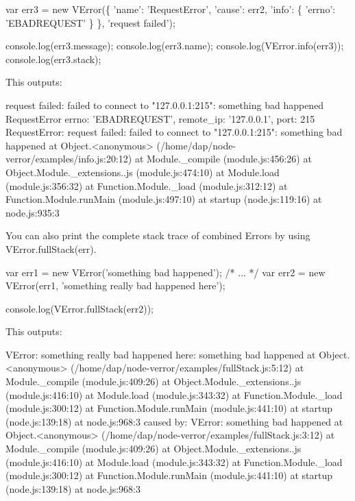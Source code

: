 \begin{DoxyCode}
var err3 = new VError(\{
    'name': 'RequestError',
    'cause': err2,
    'info': \{
        'errno': 'EBADREQUEST'
    \}
\}, 'request failed');

console.log(err3.message);
console.log(err3.name);
console.log(VError.info(err3));
console.log(err3.stack);
\end{DoxyCode}


This outputs\+: \begin{DoxyVerb}request failed: failed to connect to "127.0.0.1:215": something bad happened
RequestError
{ errno: 'EBADREQUEST', remote_ip: '127.0.0.1', port: 215 }
RequestError: request failed: failed to connect to "127.0.0.1:215": something bad happened
    at Object.<anonymous> (/home/dap/node-verror/examples/info.js:20:12)
    at Module._compile (module.js:456:26)
    at Object.Module._extensions..js (module.js:474:10)
    at Module.load (module.js:356:32)
    at Function.Module._load (module.js:312:12)
    at Function.Module.runMain (module.js:497:10)
    at startup (node.js:119:16)
    at node.js:935:3
\end{DoxyVerb}


You can also print the complete stack trace of combined {\ttfamily Error}s by using {\ttfamily V\+Error.\+full\+Stack(err).}


\begin{DoxyCode}
var err1 = new VError('something bad happened');
/* ... */
var err2 = new VError(err1, 'something really bad happened here');

console.log(VError.fullStack(err2));
\end{DoxyCode}


This outputs\+: \begin{DoxyVerb}VError: something really bad happened here: something bad happened
    at Object.<anonymous> (/home/dap/node-verror/examples/fullStack.js:5:12)
    at Module._compile (module.js:409:26)
    at Object.Module._extensions..js (module.js:416:10)
    at Module.load (module.js:343:32)
    at Function.Module._load (module.js:300:12)
    at Function.Module.runMain (module.js:441:10)
    at startup (node.js:139:18)
    at node.js:968:3
caused by: VError: something bad happened
    at Object.<anonymous> (/home/dap/node-verror/examples/fullStack.js:3:12)
    at Module._compile (module.js:409:26)
    at Object.Module._extensions..js (module.js:416:10)
    at Module.load (module.js:343:32)
    at Function.Module._load (module.js:300:12)
    at Function.Module.runMain (module.js:441:10)
    at startup (node.js:139:18)
    at node.js:968:3
\end{DoxyVerb}


